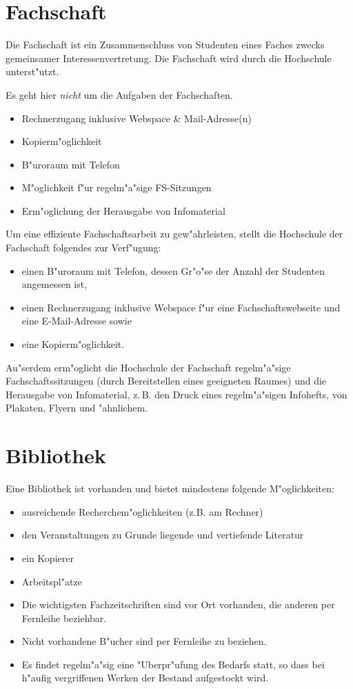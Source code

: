 \section{Fachschaft}

Die Fachschaft ist ein Zusammenschluss von Studenten eines Faches zwecks gemeinsamer Interessenvertretung.
Die Fachschaft wird durch die Hochschule unterst"utzt.

\begin{kcmt}\begin{komacmt}
Es geht hier \emph{nicht} um die Aufgaben der Fachschaften.

\begin{itemize}
	\item Rechnerzugang inklusive Webspace \& Mail-Adresse(n)
	\item Kopierm"oglichkeit
	\item B"uroraum mit Telefon
	\item M"oglichkeit f"ur regelm"a"sige FS-Sitzungen
	\item Erm"oglichung der Herausgabe von Infomaterial
\end{itemize}
\end{komacmt}\end{kcmt}

Um eine effiziente Fachschaftsarbeit zu gew"ahrleisten, stellt die Hochschule der Fachschaft folgendes zur Verf"ugung:
\begin{itemize}
	\item einen B"uroraum mit Telefon, dessen Gr"o"se der Anzahl der Studenten angemessen ist,
	\item einen Rechnerzugang inklusive Webspace f"ur eine Fachschaftswebseite und
		eine E-Mail-Adresse sowie
	\item eine Kopierm"oglichkeit.
\end{itemize}

Au"serdem erm"oglicht die Hochschule der Fachschaft regelm"a"sige
Fachschaftssitzungen (durch Bereitstellen eines geeigneten Raumes) und die
Herausgabe von Infomaterial, z.\,B. den Druck eines regelm"a"sigen Infohefts, von Plakaten,
Flyern und "ahnlichem. 

\newpage
\section{Bibliothek}
Eine Bibliothek ist vorhanden und bietet mindestens folgende M"oglichkeiten:
\begin{itemize}
	\item ausreichende Recherchem"oglichkeiten (z.B. am Rechner)
	\item den Veranstaltungen zu Grunde liegende und vertiefende Literatur
	\item ein Kopierer
	\item Arbeitspl"atze
	\item Die wichtigsten Fachzeitschriften sind vor Ort vorhanden, die anderen 
		per Fernleihe beziehbar.
	\item Nicht vorhandene B"ucher sind per Fernleihe zu beziehen.
	\item Es findet regelm"a"sig eine "Uberpr"ufung des Bedarfs statt, 
		so dass bei h"aufig vergriffenen Werken der Bestand aufgestockt wird.
\end{itemize}
